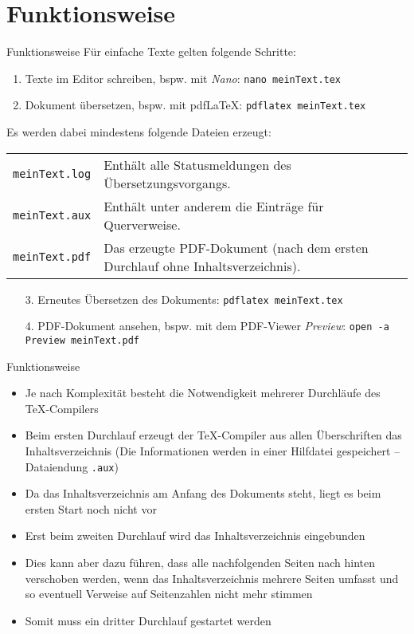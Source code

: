 \section{Funktionsweise}

\begin{frame}{Funktionsweise}
Für einfache Texte gelten folgende Schritte:
\begin{enumerate}
	\item Texte im Editor schreiben, bspw. mit \textit{Nano}: \texttt{nano meinText.tex}
	\item Dokument übersetzen, bspw. mit pdf\LaTeX{}: \texttt{pdflatex meinText.tex}
	\newline
\end{enumerate}
Es werden dabei mindestens folgende Dateien erzeugt:
\begin{tabular}[pos]{lp{8.5cm}}
	\texttt{meinText.log} & Enthält alle Statusmeldungen des Übersetzungsvorgangs. \\
	\texttt{meinText.aux} & Enthält unter anderem die Einträge für Querverweise. \\
	\texttt{meinText.pdf} & Das erzeugte PDF-Dokument (nach dem ersten Durchlauf ohne Inhaltsverzeichnis).
\end{tabular}
\begin{enumerate}
	\item[3.] Erneutes Übersetzen des Dokuments: \texttt{pdflatex meinText.tex}
	\item[4.] PDF-Dokument ansehen, bspw. mit dem PDF-Viewer \textit{Preview}: \texttt{open -a Preview meinText.pdf}
\end{enumerate}
\end{frame}

\begin{frame}{Funktionsweise}
\begin{itemize}
	\item Je nach Komplexität besteht die Notwendigkeit mehrerer Durchläufe des \TeX{}-Compilers
	\newline
	\item Beim ersten Durchlauf erzeugt der \TeX{}-Compiler aus allen Überschriften das Inhaltsverzeichnis (Die Informationen werden in einer Hilfdatei gespeichert -- Dataiendung \texttt{.aux})
	\newline
	\item Da das Inhaltsverzeichnis am Anfang des Dokuments steht, liegt es beim ersten Start noch nicht vor
	\newline
	\item Erst beim zweiten Durchlauf wird das Inhaltsverzeichnis eingebunden
	\newline
	\item Dies kann aber dazu führen, dass alle nachfolgenden Seiten nach hinten verschoben werden, wenn das Inhaltsverzeichnis mehrere Seiten umfasst und so eventuell Verweise auf Seitenzahlen nicht mehr stimmen
	\newline
	\item Somit muss ein dritter Durchlauf gestartet werden
\end{itemize}
\end{frame}
